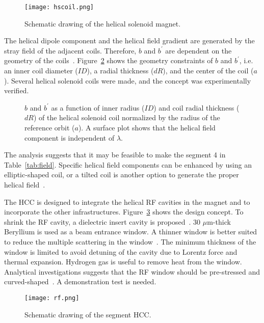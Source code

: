 \documentclass[11pt]{article}
\begin{document}
\begin{figure}[h]
\centering
 \texttt{[image: hscoil.png]}
 \caption{Schematic drawing of the helical solenoid magnet. 
    }
  \label{fig:hscoil}
\end{figure}

The helical dipole component and the helical field gradient are generated by the stray field of the adjacent coils. Therefore, $b$ and $b^\prime$ are dependent on the geometry of the coils~\cite{Mau14}. 
Figure~\ref{fig:hsfield} shows the geometry constraints of $b$ and $b^\prime$, i.e. an inner coil diameter ($ID$), a radial thickness ($dR$), and the center of the coil ($a$). 
Several helical solenoid coils were made, and the concept was experimentally verified. 
\begin{figure}[h]
\centering
\caption{$b$ and $b^\prime$ as a function of inner radius ($ID$) and coil radial thickness ($dR$) of the helical solenoid coil 
    normalized by the radius of the reference orbit ($a$). 
    A surface plot shows that the helical field component is independent of $\lambda$. 
    }
\label{fig:hsfield}
\end{figure}
The analysis suggests that it may be feasible to make the segment 4 in Table~\ref{tab:field}. 
Specific helical field components can be enhanced by using an elliptic-shaped coil, or a tilted coil is another option to generate the proper helical field~\cite{Kahn14}. 

The HCC is designed to integrate the helical RF cavities in the magnet and to incorporate the other infrastructures. Figure~\ref{fig:integ} shows the design concept. 
To shrink the RF cavity, a dielectric insert cavity is proposed~\cite{Lisa13,Ben16}. 
30 $\mu$m-thick Beryllium is used as a beam entrance window. 
A thinner window is better suited to reduce the multiple scattering in the window~\cite{Yone14}. 
The minimum thickness of the window is limited to avoid detuning of the cavity due to Lorentz force and thermal expansion. 
Hydrogen gas is useful to remove heat from the window. 
Analytical investigations suggests that the RF window should be pre-stressed and curved-shaped~\cite{Alvin}. 
A demonstration test is needed. 
\begin{figure}[h]
\centering
 \texttt{[image: rf.png]}
 \caption{Schematic drawing of the segment HCC. 
    }
  \label{fig:integ}
\end{figure}
\end{document}
